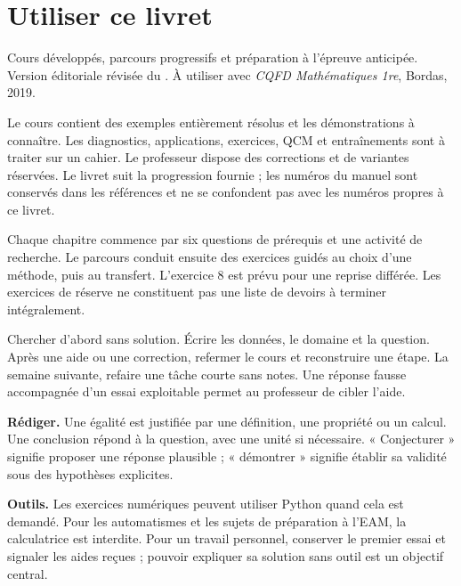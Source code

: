 \chapter*{Utiliser ce livret}
Cours développés, parcours progressifs et préparation à l’épreuve anticipée. Version éditoriale révisée du . À utiliser avec \emph{CQFD Mathématiques 1re}, Bordas, 2019.

Le cours contient des exemples entièrement résolus et les démonstrations à connaître. Les diagnostics, applications, exercices, QCM et entraînements sont à traiter sur un cahier. Le professeur dispose des corrections et de variantes réservées. Le livret suit la progression fournie ; les numéros du manuel sont conservés dans les références et ne se confondent pas avec les numéros propres à ce livret.

Chaque chapitre commence par six questions de prérequis et une activité de recherche. Le parcours conduit ensuite des exercices guidés au choix d’une méthode, puis au transfert. L’exercice 8 est prévu pour une reprise différée. Les exercices de réserve ne constituent pas une liste de devoirs à terminer intégralement.

\begin{keypoint}
Chercher d’abord sans solution. Écrire les données, le domaine et la question. Après une aide ou une correction, refermer le cours et reconstruire une étape. La semaine suivante, refaire une tâche courte sans notes. Une réponse fausse accompagnée d’un essai exploitable permet au professeur de cibler l’aide.
\end{keypoint}

\textbf{Rédiger.} Une égalité est justifiée par une définition, une propriété ou un calcul. Une conclusion répond à la question, avec une unité si nécessaire. « Conjecturer » signifie proposer une réponse plausible ; « démontrer » signifie établir sa validité sous des hypothèses explicites.

\textbf{Outils.} Les exercices numériques peuvent utiliser Python quand cela est demandé. Pour les automatismes et les sujets de préparation à l’EAM, la calculatrice est interdite. Pour un travail personnel, conserver le premier essai et signaler les aides reçues ; pouvoir expliquer sa solution sans outil est un objectif central.

